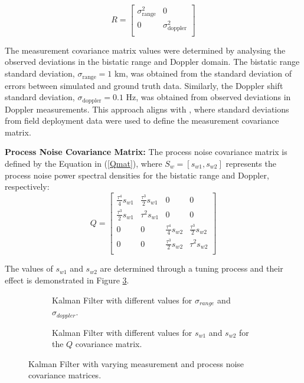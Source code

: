\begin{equation}
    R = \begin{bmatrix}
        \sigma_{\text{range}}^2 & 0 \\
        0 & \sigma_{\text{doppler}}^2 \\
    \end{bmatrix}
\end{equation}

The measurement covariance matrix values were determined by analysing the observed deviations in the bistatic range and Doppler domain. The bistatic range standard deviation, \(\sigma_{\text{range}} = 1\) km, was obtained from the standard deviation of errors between simulated and ground truth data. Similarly, the Doppler shift standard deviation, \(\sigma_{\text{doppler}} = 0.1\) Hz, was obtained from observed deviations in Doppler measurements. This approach aligns with \cite{De2015}, where standard deviations from field deployment data were used to define the measurement covariance matrix.  

\textbf{Process Noise Covariance Matrix:}
\newline
The process noise covariance matrix is defined by the Equation in (\ref{Qmat}), where \(S_w = [s_{w1}, s_{w2}]\) represents the process noise power spectral densities for the bistatic range and Doppler, respectively:
\begin{equation}
    Q  = \begin{bmatrix}
        \frac{\tau^4}{4} s_{w1} & \frac{\tau^3}{2} s_{w1} & 0 & 0 \\
        \frac{\tau^3}{2} s_{w1} & \tau^2 s_{w1} & 0 & 0 \\
        0 & 0 & \frac{\tau^4}{4} s_{w2} & \frac{\tau^3}{2} s_{w2} \\
        0 & 0 & \frac{\tau^3}{2} s_{w2} & \tau^2 s_{w2} \\
    \end{bmatrix}
    \label{Qmat}
\end{equation}

The values of \(s_{w1}  \) and \(s_{w2}\) are determined through a tuning process and their effect is demonstrated in Figure \ref{kalman_results1}.
\begin{figure}[H]
    \centering
    \begin{subfigure}[b]{0.49\linewidth}
        \centering
        
        \caption{Kalman Filter with different values for \(\sigma_{range}\) and \(\sigma_{doppler}\).}
        \label{kalman_results}
    \end{subfigure}
    \hfill
    \begin{subfigure}[b]{0.49\linewidth}
        \centering
        
        \caption{Kalman Filter with different values for \(s_{w1}\) and \(s_{w2}\) for the \(Q\) covariance matrix.}
        \label{kalman_results1}
    \end{subfigure}
    \caption{ Kalman Filter with varying measurement and process noise covariance matrices.}
\end{figure}

